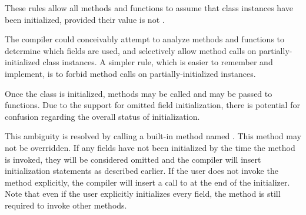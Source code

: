 These rules allow all methods and functions to assume that class instances
have been initialized, provided their value is not .

\begin{rationale}
  The compiler could conceivably attempt to analyze methods and functions to
  determine which fields are used, and selectively allow method calls on
  partially-initialized class instances. A simpler rule, which is easier to
  remember and implement, is to forbid method calls on partially-initialized
  instances.
\end{rationale}

Once the class is initialized, methods may be called and  may be
passed to functions. Due to the support for omitted field initialization, there
is potential for confusion regarding the overall status of initialization.

This ambiguity is resolved by calling a built-in method named .
This method may not be overridden. If any fields have not been initialized by
the time the  method is invoked, they will be considered omitted
and the compiler will insert initialization statements as described earlier. If
the user does not invoke the  method explicitly, the compiler
will insert a call to  at the end of the initializer. Note that
even if the user explicitly initializes every field, the  method
is still required to invoke other methods.


